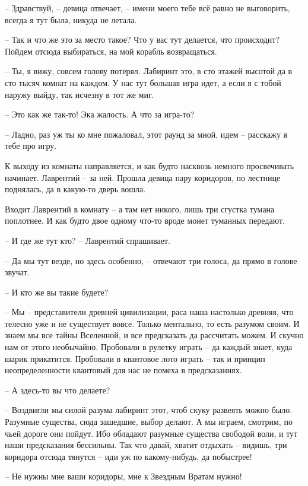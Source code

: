 \documentclass[ebook,oneside,final,openright]{memoir}
\begin{document}
– Здравствуй, – девица отвечает, – имени моего тебе всё равно не выговорить, всегда я тут была, никуда не летала.\par
– Так и что же это за место такое? Что у вас тут делается, что происходит? Пойдем отсюда выбираться, на мой корабль возвращаться.\par
– Ты, я вижу, совсем голову потерял. Лабиринт это, в сто этажей высотой да в сто тысяч комнат на каждом. У нас тут большая игра идет, а если я с тобой наружу выйду, так исчезну в тот же миг.\par
– Это как же так-то! Эка жалость. А что за игра-то?\par
– Ладно, раз уж ты ко мне пожаловал, этот раунд за мной, идем – расскажу я тебе про игру.\par
\par
К выходу из комнаты направляется, и как будто насквозь немного просвечивать начинает. Лаврентий – за ней. Прошла девица пару коридоров, по лестнице поднялась, да в какую-то дверь вошла. \par
Входит Лаврентий в комнату – а там нет никого, лишь три сгустка тумана поплотнее. И как будто двое одному что-то вроде монет туманных передают.\par
– И где же тут кто? – Лаврентий спрашивает.\par
– Да мы тут везде, но здесь особенно, – отвечают три голоса, да прямо в голове звучат.\par
– И кто же вы такие будете?\par
– Мы – представители древней цивилизации, раса наша настолько древняя, что телесно уже и не существует вовсе. Только ментально, то есть разумом своим. И знаем мы все тайны Вселенной, и все предсказать да рассчитать можем. И скучно нам от этого необычайно. Пробовали в рулетку играть – да каждый знает, куда шарик прикатится. Пробовали в квантовое лото играть – так и принцип неопределенности квантовый для нас не помеха в предсказаниях.\par
– А здесь-то вы что делаете?\par
– Воздвигли мы силой разума лабиринт этот, чтоб скуку развеять можно было. Разумные существа, сюда зашедшие, выбор делают. А мы играем, смотрим, по чьей дороге они пойдут. Ибо обладают разумные существа свободой воли, и тут наши предсказания бессильны. Так что давай, хватит отдыхать – видишь, три коридора отсюда тянутся – иди уж по какому-нибудь, да побыстрее!\par
– Не нужны мне ваши коридоры, мне к Звездным Вратам нужно!\par
\end{document}
